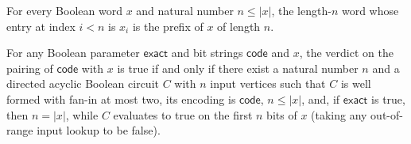 \begin{theorem}
\label{BoolCircuit.CircuitEval.ofFn_getD_eq_take}
\leanok
{}
For every Boolean word $x$ and natural number $n\le |x|$, the length-$n$ word whose
entry at index $i<n$ is $x_i$ is the prefix of $x$ of length $n$.
\end{theorem}

\begin{theorem}
\label{BoolCircuit.CircuitEval.verdict_pairEncode}
\leanok
{}
For any Boolean parameter $\mathsf{exact}$ and bit strings $\mathsf{code}$ and $x$, the
verdict on the pairing of $\mathsf{code}$ with $x$ is true if and only if there exist a
natural number $n$ and a directed acyclic Boolean circuit $C$ with $n$ input vertices
such that $C$ is well formed with fan-in at most two, its encoding is $\mathsf{code}$,
$n\le |x|$, and, if $\mathsf{exact}$ is true, then $n=|x|$, while $C$ evaluates to true
on the first $n$ bits of $x$ (taking any out-of-range input lookup to be false).
\end{theorem}
